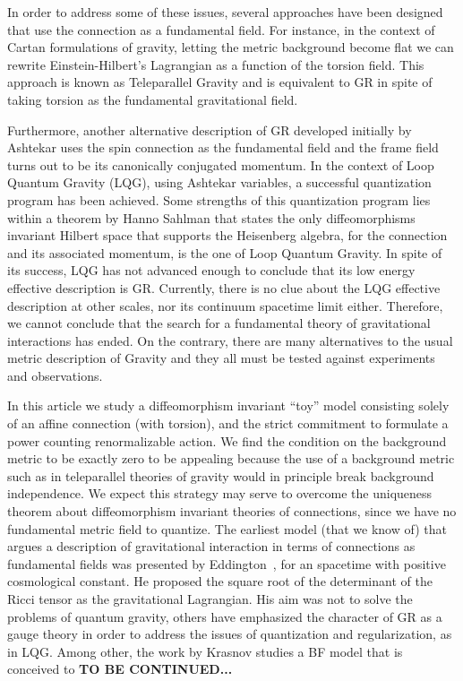 \documentclass[twocolumn,
  showpacs,showkeys,prd,superscriptaddress]{revtex4-1}
\begin{document}
In order to address some of these issues, several approaches have been designed that use the connection as a fundamental field. For instance, in the context of Cartan formulations of gravity, letting the metric background become flat we can rewrite Einstein-Hilbert's Lagrangian as a function of the torsion field. This approach is known as Teleparallel Gravity and is equivalent to GR in spite of taking torsion as the fundamental gravitational field.

Furthermore, another alternative description of GR developed initially by Ashtekar uses the spin connection as the fundamental field and the frame field turns out to be its canonically conjugated momentum. In the context of Loop Quantum Gravity (LQG), using Ashtekar variables, a successful quantization program has been achieved. Some  strengths of this quantization program lies within a theorem by Hanno Sahlman that states the only diffeomorphisms invariant Hilbert space that supports the Heisenberg algebra, for the connection and its associated momentum, is the one of Loop Quantum Gravity. In spite of its success, LQG has not advanced enough to conclude that its low energy effective description is GR. Currently, there is no clue about the LQG effective description at other scales,  nor its continuum spacetime limit either. Therefore, we cannot conclude that the search for a fundamental theory of gravitational interactions has ended. On the contrary, there are many alternatives to the usual metric description of Gravity and they all must be tested against experiments and observations.

In this article we study a diffeomorphism invariant ``toy'' model  consisting  solely of an affine connection  (with torsion), and the strict commitment to formulate a power counting renormalizable action.  We find the condition on the background metric to be exactly zero to be appealing because the use of a background metric such as in teleparallel theories of gravity would in principle break background independence. We expect  this strategy may serve to overcome  the uniqueness theorem about diffeomorphism invariant theories of connections, since we  have no fundamental metric field to quantize. The earliest model (that we know of) that argues  a description of gravitational interaction in terms of connections as fundamental fields  was presented by Eddington~\cite{Eddington1923math}, for an spacetime with positive cosmological constant. He proposed the square root of the determinant of the Ricci tensor as the gravitational Lagrangian. His aim was not to solve the problems of quantum gravity,  others have emphasized the character of GR as a gauge theory in order to address the issues of quantization and regularization, as in LQG. Among other, the work by  Krasnov studies a BF model that is conceived to {\bfseries \color{blue} TO BE CONTINUED...}
\end{document}
